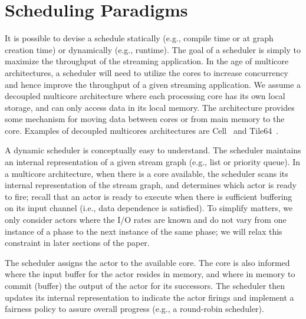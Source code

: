 \section{Scheduling Paradigms}


It is possible to devise a schedule statically (e.g., compile time or
at graph creation time) or dynamically (e.g., runtime). The goal of a
scheduler is simply to maximize the throughput of the streaming
application. In the age of multicore architectures, a scheduler will
need to utilize the cores to increase concurrency and hence improve
the throughput of a given streaming application.  We assume a
decoupled multicore architecture where each processing core has its
own local storage, and can only access data in its local memory. The
architecture provides some mechanism for moving data between cores or
from main memory to the core. Examples of decoupled multicores
architectures are Cell~\cite{cell} and Tile64~\cite{tilera}.

A dynamic scheduler is conceptually easy to understand. The scheduler
maintains an internal representation of a given stream graph (e.g.,
list or priority queue). In a multicore architecture, when there is a
core available, the scheduler scans its internal representation of the
stream graph, and determines which actor is ready to fire; recall that
an actor is ready to execute when there is sufficient buffering on its
input channel (i.e., data dependence is satisfied).  To simplify
matters, we only consider actors where the I/O rates are known and do
not vary from one instance of a phase to the next instance of the same
phase; we will relax this constraint in later sections of the paper.

The scheduler assigns the actor to the available core. The core is
also informed where the input buffer for the actor resides in memory,
and where in memory to commit (buffer) the output of the actor for its
successors. The scheduler then updates its internal representation to
indicate the actor firings and implement a fairness policy to assure
overall progress (e.g., a round-robin scheduler).

